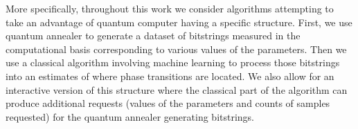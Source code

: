 \documentclass[
  american,aps,pra,reprint,floatfix,nofootinbib,superscriptaddress
]{revtex4-2}
\begin{document}
More specifically, throughout this work we consider algorithms attempting
to take an advantage of quantum computer having a specific structure. First,
we use quantum annealer to generate a dataset of bitstrings measured
in the computational basis corresponding
to various values of the parameters. Then we use a classical algorithm
involving machine learning
to process those bitstrings into an estimates of where phase transitions
are located. We also allow for an interactive version of this structure
where the classical part of the algorithm can produce additional requests
(values of the parameters and counts of samples requested) for the quantum
annealer generating bitstrings.
\begin{center}
  \pgfmathparse{\columnwidth/13.37cm}%
  \edef\tikzscale{\pgfmathresult}%
\end{center}
\end{document}
